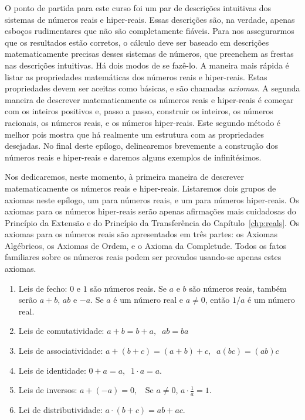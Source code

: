 \documentclass{svmono}
\begin{document}
O ponto de partida para este curso foi um par de descrições intuitivas
dos sistemas de números reais e hiper-reais. Essas descrições são,
na verdade, apenas esboços rudimentares que não são completamente
fiáveis. Para nos assegurarmos que os resultados estão corretos, o
cálculo deve ser baseado em descrições matematicamente precisas desses
sistemas de números, que preenchem as frestas nas descrições intuitivas.
Há dois modos de se fazê-lo. A maneira mais rápida é listar as propriedades
matemáticas dos números reais e hiper-reais. Estas propriedades devem ser
aceitas como básicas, e são chamadas \emph{axiomas}. A segunda maneira
de descrever matematicamente os números reais e hiper-reais é começar com
os inteiros positivos e, passo a passo, construir os inteiros, os 
números racionais, os números reais, e os números hiper-reais. Este
segundo método é melhor pois mostra que há realmente um estrutura com as
propriedades desejadas. No final deste epílogo, delinearemos brevemente a
construção dos números reais e hiper-reais e daremos alguns exemplos de
infinitésimos.

Nos dedicaremos, neste momento, à primeira maneira de descrever
matematicamente os números reais e hiper-reais. Listaremos dois grupos
de axiomas neste epílogo, um para números reais, e um para números
hiper-reais. Os axiomas para os números hiper-reais serão apenas
afirmações mais cuidadosas do Princípio da Extensão e do Princípio
da Transferência do Capítulo~\ref{chp:reals}. Os axiomas para os
números reais são apresentados em três partes: os Axiomas Algébricos, os
Axiomas de Ordem, e o Axioma da Completude. Todos os fatos familiares
sobre os números reais podem ser provados usando-se apenas estes
axiomas.


\begin{enumerate}[A]
\item Leis de fecho: $0$ e $1$ são números reais. Se $a$ e $b$ são
      números reais, também serão $a+b$, $ab$ e $-a$. Se $a$ é um
      número real e $a \ne 0$, então $1/a$ é um número real.
\item Leis de comutatividade: $a+b = b + a, \; \; ab = ba$
\item Leis de associatividade: $a+(b+c) = (a+b) + c, \; \; a(bc) = (ab)c$
\item Leis de identidade: $0 + a = a, \; \; 1 \cdot a = a.$
\item Leis de inversos: $a+(-a) = 0, \; \;$ Se $a \ne 0$, $a \cdot \frac{1}{a} = 1.$
\item Lei de distributividade: $a \cdot (b+c) = ab + ac.$
\end{enumerate}
\end{document}
